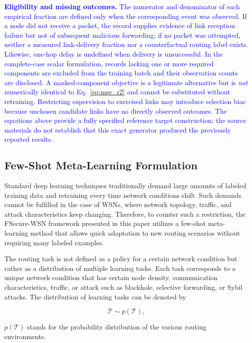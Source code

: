 \documentclass[pdflatex,sn-mathphys-num]{sn-jnl}
\newcommand{\Revised}[1]{\textcolor{blue}{#1}}
\begin{document}
\Revised{\textbf{Eligibility and missing outcomes.} The numerator and denominator of each empirical fraction are defined only when the corresponding event was observed. If a node did not receive a packet, the record supplies evidence of link reception failure but not of subsequent malicious forwarding; if no packet was attempted, neither a measured link-delivery fraction nor a counterfactual routing label exists. Likewise, one-hop delay is undefined when delivery is unsuccessful. In the complete-case scalar formulation, records lacking one or more required components are excluded from the training batch and their observation counts are disclosed. A masked-component objective is a legitimate alternative but is \emph{not} numerically identical to Eq.~\eqref{eq:mse_r2} and cannot be substituted without retraining. Restricting supervision to exercised links may introduce selection bias because unchosen candidate links have no directly observed outcomes. The equations above provide a fully specified reference target construction; the source materials do not establish that this exact generator produced the previously reported results.}\par

\subsection{Few-Shot Meta-Learning Formulation}

Standard deep learning techniques traditionally demand large amounts of labeled training data and retraining every time network conditions shift. Such demands cannot be fulfilled in the case of WSNs, where network topology, traffic, and attack characteristics keep changing. Therefore, to counter such a restriction, the FSecure-WSN framework presented in this paper utilizes a few-shot meta-learning method that allows quick adaptation to new routing scenarios without requiring many labeled examples.

The routing task is not defined as a policy for a certain network condition but rather as a distribution of multiple learning tasks. Each task corresponds to a unique network condition that has certain node density, communication characteristics, traffic, or attack such as blackhole, selective forwarding, or Sybil attacks. The distribution of learning tasks can be denoted by

\[
\mathcal{T}\sim p(\mathcal{T}),
\]

$p(\mathcal{T})$ stands for the probability distribution of the various routing environments.
\end{document}
